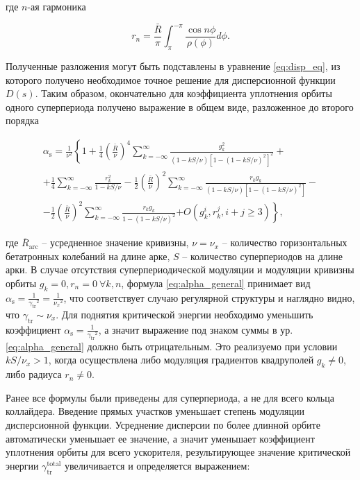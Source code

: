 \noindent где $n$-ая гармоника

\begin{equation}
r_n=\frac{\bar{R}}{\pi} \int_\pi^{-\pi} \frac{\cos n \phi}{\rho(\phi)} d \phi.
\end{equation}

\noindent Полученные разложения могут быть подставлены в уравнение \ref{eq:disp_eq}, из которого получено необходимое точное решение для дисперсионной функции $D(s)$. Таким образом, окончательно для коэффициента уплотнения орбиты одного суперпериода получено выражение в общем виде, разложенное до второго порядка

\begin{equation}
\begin{gathered}
\alpha_{\text{s}}=\frac{1}{\nu^2}\left\{1+\frac{1}{4}\left(\frac{\bar{R}}{\nu}\right)^4 \sum_{k=-\infty}^{\infty}\right.
\frac{g_k^2}{(1-k S / \nu)\left[1-(1-k S / \nu)^2\right]^2}+ \\
+\frac{1}{4} \sum_{k=-\infty}^{\infty} \frac{r_k^2}{1-k S / \nu} -\frac{1}{2}\left(\frac{\bar{R}}{\nu}\right)^2 \sum_{k=-\infty}^{\infty} \frac{r_k g_k}{(1-k S / \nu)\left[1-(1-k S / \nu)^2\right]} - \\
-\frac{1}{2}\left(\frac{\bar{R}}{\nu}\right)^2 \sum_{k=-\infty}^{\infty} \frac{r_k g_k}{1-(1-k S / \nu)^2}
\left.+O\left(g_k^i, r_k^j, i+j \geq 3\right)\right\},
\end{gathered}
\label{eq:alpha_general}
\end{equation}

\noindent где ${\overline{R}}_{\text{arc}}$ -- усредненное значение кривизны, $\nu=\nu_{x}$ -- количество горизонтальных бетатронных колебаний на длине арке, $S$ -- количество суперпериодов на длине арки. В случае отсутствия суперпериодической модуляции и модуляции кривизны орбиты $g_k=0, r_n=0 \  \forall k,n$, формула \ref{eq:alpha_general} принимает вид $\alpha_{\text{s}}=\frac{1}{{\gamma_{\text{tr}}}^2}=\frac{1}{{\nu_x}^2}$, что соответствует случаю регулярной структуры и наглядно видно, что  $\gamma_{\text{tr}}\sim\nu_x$. Для поднятия критической энергии необходимо уменьшить коэффициент $\alpha_{\text{s}}=\frac{1}{{\gamma_{\text{tr}}}^2}$, а значит выражение под знаком суммы в ур.\ref{eq:alpha_general} должно быть отрицательным. Это реализуемо при условии $kS/\nu_{x}>1$, когда осуществлена либо модуляция градиентов квадруполей $g_k\not=0$, либо радиуса $r_n\not=0$.

\par Ранее все формулы были приведены для суперпериода, а не для всего кольца коллайдера. Введение прямых участков уменьшает степень модуляции дисперсионной функции. Усреднение дисперсии по более длинной орбите автоматически уменьшает ее значение, а значит уменьшает коэффициент уплотнения орбиты для всего ускорителя, результирующее значение критической энергии $\gamma_{\text{tr}}^{\text{total}}$ увеличивается и определяется выражением:

